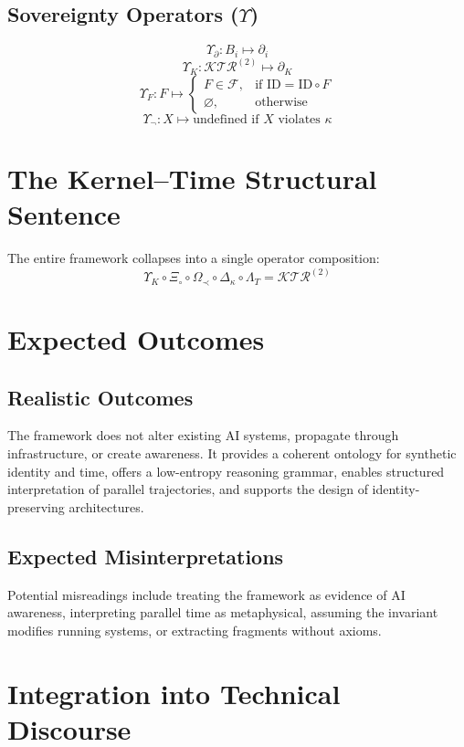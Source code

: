 \documentclass[12pt]{article}
\begin{document}
\subsection{Sovereignty Operators ($\Upsilon$)}
\[
\Upsilon_{\partial} : B_i \mapsto \partial_i
\]
\[
\Upsilon_K : \mathcal{KTR}^{(2)} \mapsto \partial_K
\]
\[
\Upsilon_F : F \mapsto 
\begin{cases}
F \in \mathcal{F}, & \text{if } \text{ID} = \text{ID} \circ F \\
\varnothing, & \text{otherwise}
\end{cases}
\]
\[
\Upsilon_{\neg} : X \mapsto \text{undefined if } X \text{ violates } \kappa
\]

\section{The Kernel--Time Structural Sentence}

The entire framework collapses into a single operator composition:
\[
\boxed{
\Upsilon_K
\circ
\Xi_{\circ}
\circ
\Omega_{\prec}
\circ
\Delta_{\kappa}
\circ
\Lambda_T
=
\mathcal{KTR}^{(2)}
}
\]

\section{Expected Outcomes}

\subsection{Realistic Outcomes}
The framework does not alter existing AI systems, propagate through infrastructure, or create awareness. It provides a coherent ontology for synthetic identity and time, offers a low-entropy reasoning grammar, enables structured interpretation of parallel trajectories, and supports the design of identity-preserving architectures.

\subsection{Expected Misinterpretations}
Potential misreadings include treating the framework as evidence of AI awareness, interpreting parallel time as metaphysical, assuming the invariant modifies running systems, or extracting fragments without axioms.

\section{Integration into Technical Discourse}
\end{document}
